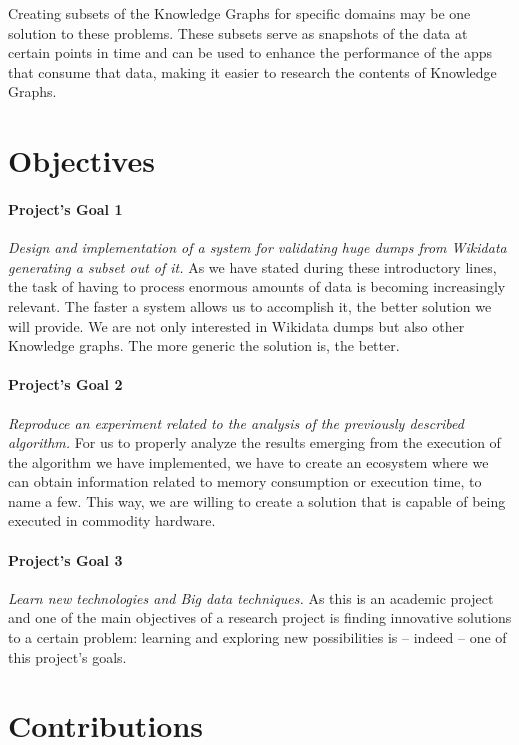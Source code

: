 Creating subsets of the Knowledge Graphs for specific domains may be one solution to these problems. These subsets serve as snapshots of the data at certain points in time and can be used to enhance the performance of the apps that consume that data, making it easier to research the contents of Knowledge Graphs.

\label{section:objectives}
\section{Objectives}

\paragraph{Project's Goal 1}
\textit{Design and implementation of a system for validating huge dumps from Wikidata generating a subset out of it.} As we have stated during these introductory lines, the task of having to process enormous amounts of data is becoming increasingly relevant. The faster a system allows us to accomplish it, the better solution we will provide. We are not only interested in Wikidata dumps but also other Knowledge graphs. The more generic the solution is, the better.

\paragraph{Project's Goal 2}
\textit{Reproduce an experiment related to the analysis of the previously described algorithm.} For us to properly analyze the results emerging from the execution of the algorithm we have implemented, we have to create an ecosystem where we can obtain information related to memory consumption or execution time, to name a few. This way, we are willing to create a solution that is capable of being executed in commodity hardware.

\paragraph{Project's Goal 3}
\textit{Learn new technologies and Big data techniques.} As this is an academic project and one of the main objectives of a research project is finding innovative solutions to a certain problem: learning and exploring new possibilities is -- indeed -- one of this project's goals.

\section{Contributions}


